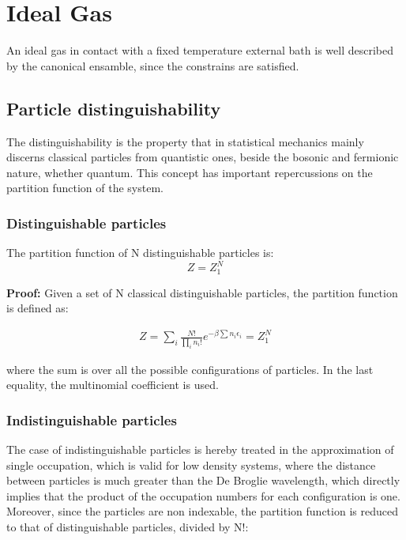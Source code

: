 \documentclass{article}
\begin{document}
\newpage

\section{Ideal Gas}

An ideal gas in contact with a fixed temperature external bath is well described by the canonical ensamble,
since the constrains are satisfied.

\subsection{Particle distinguishability}

The distinguishability is the property that in statistical mechanics mainly discerns classical particles from quantistic ones,
beside the bosonic and fermionic nature, whether quantum.
This concept has important repercussions on the partition function of the system.


\subsubsection{Distinguishable particles}

\begin{tcolorbox}[colframe=gray!50, colback=gray!10, coltitle=black, title=Distinguishable Particles Partition Function]
    The partition function of N distinguishable particles is:
    \begin{equation}
        Z=Z_1^N
    \end{equation}
\end{tcolorbox}

\textbf{Proof:}
Given a set of N classical distinguishable particles, the partition function is defined as:

\begin{align*}
    Z= \sum_{i} \frac{N!}{\prod_in_i!}e^{-\beta\sum n_i\epsilon_i}=Z_1^N
\end{align*}

where the sum is over all the possible configurations of particles. In the last equality, the multinomial coefficient is used.

\subsubsection{Indistinguishable particles}

The case of indistinguishable particles is hereby treated in the approximation of single occupation, which is valid for low density systems, where the distance between particles is much greater than the De Broglie wavelength,
which directly implies that the product of the occupation numbers for each configuration is one.
Moreover, since the particles are non indexable, the partition function is reduced to that of distinguishable particles, divided by N!:
\end{document}
